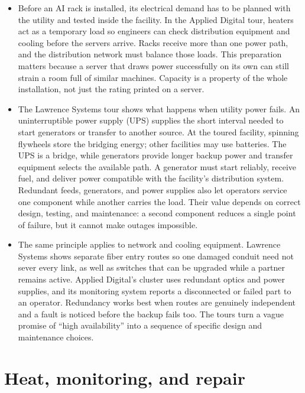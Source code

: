 \documentclass[10pt]{article}
\begin{document}
\begin{itemize}[leftmargin=1.25em, itemsep=0.3em, parsep=0pt, topsep=0pt]
    \item Before an AI rack is installed, its electrical demand has to be planned with the utility and tested inside the facility. In the Applied Digital tour, heaters act as a temporary load so engineers can check distribution equipment and cooling before the servers arrive. Racks receive more than one power path, and the distribution network must balance those loads. This preparation matters because a server that draws power successfully on its own can still strain a room full of similar machines. Capacity is a property of the whole installation, not just the rating printed on a server.

    \item The Lawrence Systems tour shows what happens when utility power fails. An uninterruptible power supply (UPS) supplies the short interval needed to start generators or transfer to another source. At the toured facility, spinning flywheels store the bridging energy; other facilities may use batteries. The UPS is a bridge, while generators provide longer backup power and transfer equipment selects the available path. A generator must start reliably, receive fuel, and deliver power compatible with the facility's distribution system. Redundant feeds, generators, and power supplies also let operators service one component while another carries the load. Their value depends on correct design, testing, and maintenance: a second component reduces a single point of failure, but it cannot make outages impossible.

    \item The same principle applies to network and cooling equipment. Lawrence Systems shows separate fiber entry routes so one damaged conduit need not sever every link, as well as switches that can be upgraded while a partner remains active. Applied Digital's cluster uses redundant optics and power supplies, and its monitoring system reports a disconnected or failed part to an operator. Redundancy works best when routes are genuinely independent and a fault is noticed before the backup fails too. The tours turn a vague promise of ``high availability'' into a sequence of specific design and maintenance choices.
\end{itemize}

\section*{Heat, monitoring, and repair}
\end{document}
